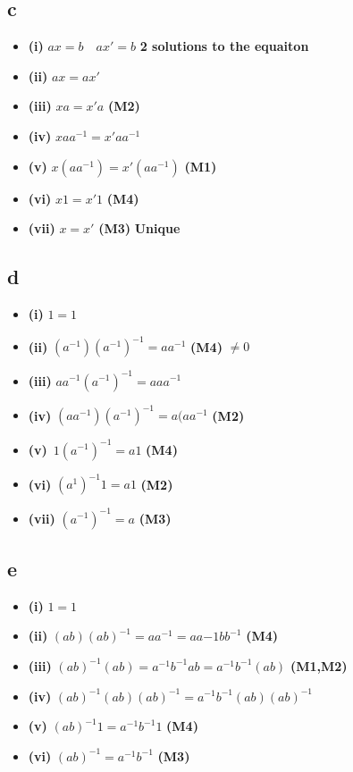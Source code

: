 \documentclass[]{article}
\providecommand{\tightlist}{%
  \setlength{\itemsep}{0pt}\setlength{\parskip}{0pt}}
\begin{document}
\hypertarget{c}{%
\subsection{c}\label{c}}

\begin{itemize}
\tightlist
\item
  \textbf{(i)} \(ax = b \quad ax' = b\) \textbf{2 solutions to the
  equaiton}
\item
  \textbf{(ii)} \(ax = ax'\)
\item
  \textbf{(iii)} \(xa = x'a\) \textbf{(M2)}
\item
  \textbf{(iv)} \(xaa^{-1} =x' a a^{-1}\)
\item
  \textbf{(v)} \(x(aa^{-1} )= x'(a a^{-1})\) \textbf{(M1)}
\item
  \textbf{(vi)} \(x1= x'1\) \textbf{(M4)}
\item
  \textbf{(vii)} \(x = x'\) \textbf{(M3)} \textbf{Unique}
\end{itemize}

\hypertarget{d-1}{%
\subsection{d}\label{d-1}}

\begin{itemize}
\tightlist
\item
  \textbf{(i)} \(1 = 1\)
\item
  \textbf{(ii)} \((a^{-1})(a^{-1})^{-1} = a a^{-1}\) \textbf{(M4)}
  \textbf{\(\neq 0\)}
\item
  \textbf{(iii)} \(a a^{-1} (a^{-1})^{-1} = a a a^{-1}\)
\item
  \textbf{(iv)} \((a a^{-1}) (a^{-1})^{-1} = a (a a^{-1}\) \textbf{(M2)}
\item
  \textbf{(v)} \(\,1 (a^{-1})^{-1} = a 1\) \textbf{(M4)}
\item
  \textbf{(vi)} \((a^{1})^{-1} 1 = a 1\) \textbf{(M2)}
\item
  \textbf{(vii)} \((a^{-1})^{-1} = a\) \textbf{(M3)}
\end{itemize}

\hypertarget{e-1}{%
\subsection{e}\label{e-1}}

\begin{itemize}
\tightlist
\item
  \textbf{(i)} \(1 = 1\)
\item
  \textbf{(ii)} \((ab)(ab)^{-1} = a a^{-1} = a a{-1} b b^{-1}\)
  \textbf{(M4)}
\item
  \textbf{(iii)}
  \((ab)^{-1}(ab) = a^{-1} b^{-1} ab = a^{-1} b^{-1} (ab)\)
  \textbf{(M1,M2) }
\item
  \textbf{(iv)} \((ab)^{-1}(ab)(ab)^{-1} = a^{-1}b^{-1} (ab) (ab)^{-1}\)
\item
  \textbf{(v)} \((ab)^{-1} 1 = a^{-1} b^{-1} 1\) \textbf{(M4)}
\item
  \textbf{(vi)} \((ab)^{-1} = a^{-1} b^{-1}\) \textbf{(M3)}
\end{itemize}
\end{document}
